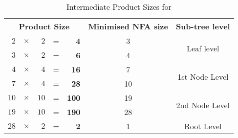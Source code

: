 \begin{table}
    \centering
    \newcommand{\hilight}[1]{\textbf{#1}}
\begin{tabular}{| r c r c | r | c | c |}
    \hline
    \multicolumn{5}{|c|}{\textbf{Product Size}} & \textbf{Minimised NFA size} &
    \textbf{Sub-tree level} \\
    \hline
    $2$ &$\times$ &$2$ &= &\hilight{4} &3 & \multirow{2}{*}{Leaf level} \\
    $3$ &$\times$ &$2$ &= &\hilight{6} &4 &\\
    \hline
    $4$ &$\times$ &$4$ &= &\hilight{16} &7 & \multirow{2}{*}{1st Node Level} \\
    $7$ &$\times$ &$4$ &= &\hilight{28} &10 & \\
    \hline
    $10$ &$\times$ &$10$ &= &\hilight{100} &19 & \multirow{2}{*}{2nd Node Level} \\
    $19$ &$\times$ &$10$ &= &\hilight{190} &28 & \\
    \hline
    $28$ &$\times$ &$2$ &= &\hilight{2} &1 & Root Level \\
    \hline
\end{tabular}
\caption{Intermediate Product Sizes for }
\label{tbl:productSizesDisTree}
\end{table}
